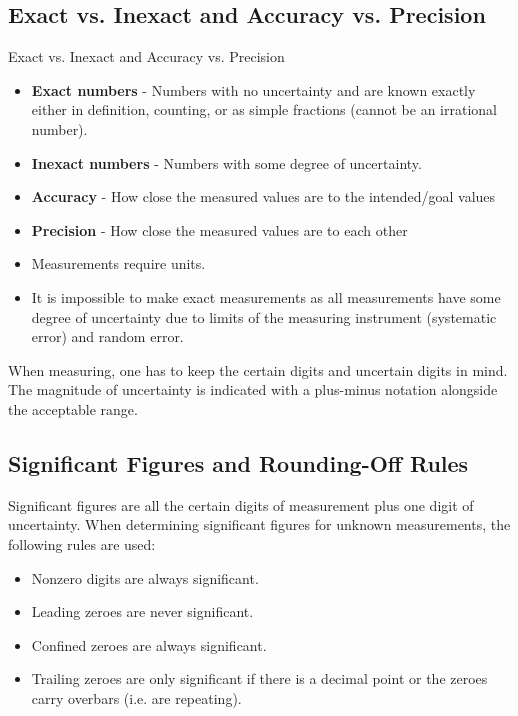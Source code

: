 \subsection{Exact vs. Inexact and Accuracy vs. Precision}
\begin{defn}
Exact vs. Inexact and Accuracy vs. Precision
\begin{itemize}
	\item \textbf{Exact numbers} - Numbers with no uncertainty and are known exactly either in definition, counting, or as simple fractions (cannot be an irrational number). 
	\item \textbf{Inexact numbers} - Numbers with some degree of uncertainty.
	\item \textbf{Accuracy} - How close the measured values are to the intended/goal values
	\item \textbf{Precision} - How close the measured values are to each other
\end{itemize}
\end{defn}

\begin{itemize}
\item Measurements require units.
\item It is impossible to make exact measurements as all measurements have some degree of uncertainty due to limits of the measuring instrument (systematic error) and random error.
\end{itemize}

\noindent
When measuring, one has to keep the certain digits and uncertain digits in mind. The magnitude of uncertainty is indicated with a plus-minus notation alongside the acceptable range.

\subsection{Significant Figures and Rounding-Off Rules}
Significant figures are all the certain digits of measurement plus one digit of uncertainty. When determining significant figures for unknown measurements, the following rules are used:

\begin{itemize}
	\item Nonzero digits are always significant.
	\item Leading zeroes are never significant.
	\item Confined zeroes are always significant.
	\item Trailing zeroes are only significant if there is a decimal point or the zeroes carry overbars (i.e. are repeating).
\end{itemize}

